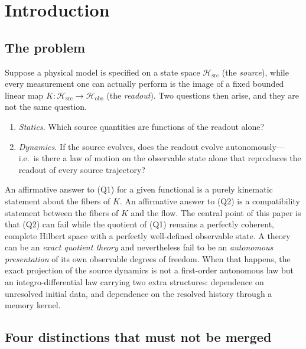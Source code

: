\documentclass[11pt,reqno]{amsart}
\numberwithin{equation}{section}
\theoremstyle{plain}
\theoremstyle{definition}
\theoremstyle{remark}
\newcommand{\Hsrc}{\mathcal{H}_{\mathrm{src}}}
\newcommand{\Hobs}{\mathcal{H}_{\mathrm{obs}}}
\begin{document}
\maketitle

\section{Introduction}
\label{sec:intro}

\subsection{The problem}

Suppose a physical model is specified on a state space $\Hsrc$ (the \emph{source}), while
every measurement one can actually perform is the image of a fixed bounded linear map
$K:\Hsrc\to\Hobs$ (the \emph{readout}). Two questions then arise, and they are not the
same question.

\begin{enumerate}
\item[(Q1)] \emph{Statics.} Which source quantities are functions of the readout alone?
\item[(Q2)] \emph{Dynamics.} If the source evolves, does the readout evolve
autonomously---i.e.\ is there a law of motion on the observable state alone that
reproduces the readout of every source trajectory?
\end{enumerate}

An affirmative answer to (Q1) for a given functional is a purely kinematic statement about
the fibers of $K$. An affirmative answer to (Q2) is a compatibility statement between the
fibers of $K$ and the flow. The central point of this paper is that (Q2) can fail while
the quotient of (Q1) remains a perfectly coherent, complete Hilbert space with a perfectly
well-defined observable state. A theory can be an \emph{exact quotient theory} and
nevertheless fail to be an \emph{autonomous presentation} of its own observable degrees of
freedom. When that happens, the exact projection of the source dynamics is not a
first-order autonomous law but an integro-differential law carrying two extra structures:
dependence on unresolved initial data, and dependence on the resolved history through a
memory kernel.

\subsection{Four distinctions that must not be merged}
\end{document}
